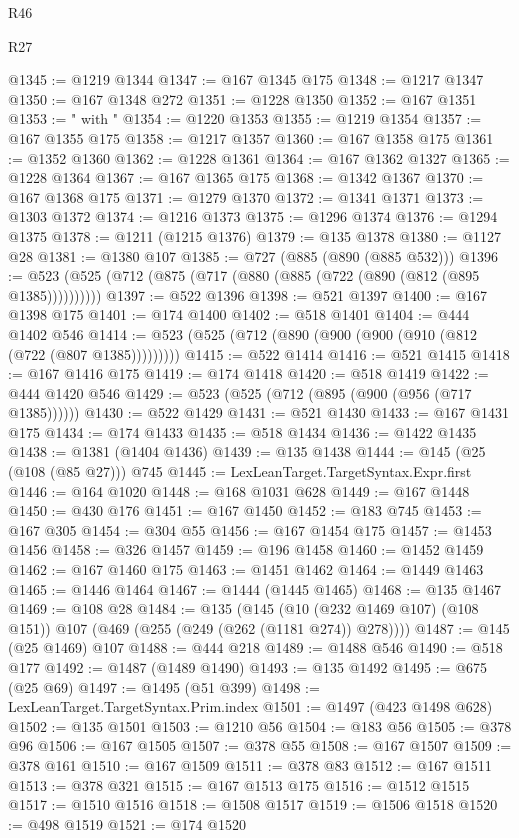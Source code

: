 \begin{lexlean}{R46}
\begin{lexlean}{R27}
\begin{coremodule}
{{{{{{{{{{{{{{{{{{{{{{{{{{{{{{{{{{{{{{{{{{{{{{{{{{{{{{{{{{{{{{@1345 := @1219 @1344
@1347 := @167 @1345 @175
@1348 := @1217 @1347
@1350 := @167 @1348 @272
@1351 := @1228 @1350
@1352 := @167 @1351
@1353 := " with "
@1354 := @1220 @1353
@1355 := @1219 @1354
@1357 := @167 @1355 @175
@1358 := @1217 @1357
@1360 := @167 @1358 @175
@1361 := @1352 @1360
@1362 := @1228 @1361
@1364 := @167 @1362 @1327
@1365 := @1228 @1364
@1367 := @167 @1365 @175
@1368 := @1342 @1367
@1370 := @167 @1368 @175
@1371 := @1279 @1370
@1372 := @1341 @1371
@1373 := @1303 @1372
@1374 := @1216 @1373
@1375 := @1296 @1374
@1376 := @1294 @1375
@1378 := @1211 (@1215 @1376)
@1379 := @135 @1378
@1380 := @1127 @28
@1381 := @1380 @107
@1385 := @727 (@885 (@890 (@885 @532)))
@1396 := @523 (@525 (@712 (@875 (@717 (@880 (@885 (@722 (@890 (@812 (@895 @1385))))))))))
@1397 := @522 @1396
@1398 := @521 @1397
@1400 := @167 @1398 @175
@1401 := @174 @1400
@1402 := @518 @1401
@1404 := @444 @1402 @546
@1414 := @523 (@525 (@712 (@890 (@900 (@900 (@910 (@812 (@722 (@807 @1385)))))))))
@1415 := @522 @1414
@1416 := @521 @1415
@1418 := @167 @1416 @175
@1419 := @174 @1418
@1420 := @518 @1419
@1422 := @444 @1420 @546
@1429 := @523 (@525 (@712 (@895 (@900 (@956 (@717 @1385))))))
@1430 := @522 @1429
@1431 := @521 @1430
@1433 := @167 @1431 @175
@1434 := @174 @1433
@1435 := @518 @1434
@1436 := @1422 @1435
@1438 := @1381 (@1404 @1436)
@1439 := @135 @1438
@1444 := @145 (@25 (@108 (@85 @27))) @745
@1445 := LexLeanTarget.TargetSyntax.Expr.first
@1446 := @164 @1020
@1448 := @168 @1031 @628
@1449 := @167 @1448
@1450 := @430 @176
@1451 := @167 @1450
@1452 := @183 @745
@1453 := @167 @305
@1454 := @304 @55
@1456 := @167 @1454 @175
@1457 := @1453 @1456
@1458 := @326 @1457
@1459 := @196 @1458
@1460 := @1452 @1459
@1462 := @167 @1460 @175
@1463 := @1451 @1462
@1464 := @1449 @1463
@1465 := @1446 @1464
@1467 := @1444 (@1445 @1465)
@1468 := @135 @1467
@1469 := @108 @28
@1484 := @135
    (@145 (@10 (@232 @1469 @107) (@108 @151)) @107 (@469 (@255 (@249 (@262 (@1181 @274)) @278))))
@1487 := @145 (@25 @1469) @107
@1488 := @444 @218
@1489 := @1488 @546
@1490 := @518 @177
@1492 := @1487 (@1489 @1490)
@1493 := @135 @1492
@1495 := @675 (@25 @69)
@1497 := @1495 (@51 @399)
@1498 := LexLeanTarget.TargetSyntax.Prim.index
@1501 := @1497 (@423 @1498 @628)
@1502 := @135 @1501
@1503 := @1210 @56
@1504 := @183 @56
@1505 := @378 @96
@1506 := @167 @1505
@1507 := @378 @55
@1508 := @167 @1507
@1509 := @378 @161
@1510 := @167 @1509
@1511 := @378 @83
@1512 := @167 @1511
@1513 := @378 @321
@1515 := @167 @1513 @175
@1516 := @1512 @1515
@1517 := @1510 @1516
@1518 := @1508 @1517
@1519 := @1506 @1518
@1520 := @498 @1519
@1521 := @174 @1520
}}}}}}}}}}}}}}}}}}}}}}}}}}}}}}}}}}}}}}}}}}}}}}}}}}}}}}}}}}}}}}
\end{coremodule}
\end{lexlean}
\end{lexlean}

